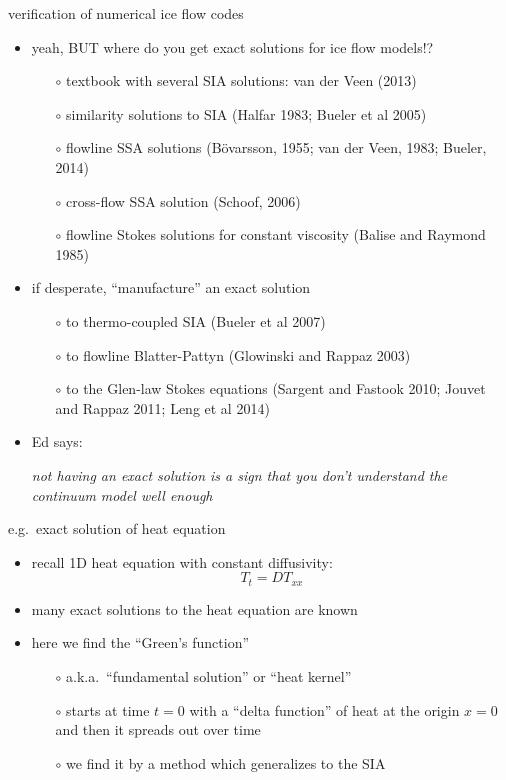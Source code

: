\begin{frame}{verification of numerical ice flow codes }
\begin{itemize}
\item<1-> yeah, BUT where do you get exact solutions for ice flow models!?
  \begin{itemize}
  \item[$\circ$] textbook with several SIA solutions: van der Veen (2013)
  \item[$\circ$] similarity solutions to SIA (Halfar 1983; Bueler et al 2005)
  \item[$\circ$] flowline SSA solutions (B\"o\dh varsson, 1955; van der Veen, 1983; Bueler, 2014)
  \item[$\circ$] cross-flow SSA solution (Schoof, 2006)
  \item[$\circ$] flowline Stokes solutions for constant viscosity (Balise and Raymond 1985)
  \end{itemize}

\item<1-> if desperate, ``manufacture'' an exact solution
  \begin{itemize}
  \item[$\circ$] to thermo-coupled SIA (Bueler et al 2007)
  \item[$\circ$] to flowline Blatter-Pattyn (Glowinski and Rappaz 2003)
  \item[$\circ$] to the Glen-law Stokes equations (Sargent and Fastook 2010; Jouvet and Rappaz 2011; Leng et al 2014)
  \end{itemize}

\smallskip
\item<2> Ed says:
\begin{center}
\emph{not having an exact solution is a sign that you don't understand the continuum model well enough}
\end{center}
\end{itemize}
\end{frame}


\begin{frame}{e.g.~exact solution of heat equation}

\begin{itemize}
\item recall 1D heat equation with constant diffusivity:
	$$T_t = D T_{xx}$$
\item many exact solutions to the heat equation are known

\bigskip
\item here we find the ``Green's function''
  \begin{itemize}
  \item[$\circ$] a.k.a.~``fundamental solution'' or ``heat kernel''
  \item[$\circ$] starts at time $t=0$ with a ``delta function'' of heat at the origin $x=0$ and then it spreads out over time
  \item[$\circ$] we find it by a method which generalizes to the SIA
  \end{itemize}
\end{itemize}
\end{frame}


